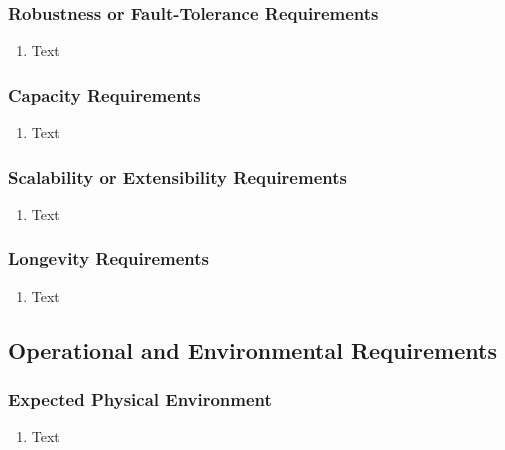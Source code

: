 \documentclass [11pt]{article}
\begin{document}
\subsubsection{Robustness or Fault-Tolerance Requirements }
	\begin{enumerate}[label=\textbf{(\roman*)}]
		\item Text
	\end{enumerate}

\subsubsection{Capacity Requirements }
	\begin{enumerate}[label=\textbf{(\roman*)}]
		\item Text
	\end{enumerate}

\subsubsection{Scalability or Extensibility Requirements }
	\begin{enumerate}[label=\textbf{(\roman*)}]
		\item Text
	\end{enumerate}

\subsubsection{Longevity Requirements }
	\begin{enumerate}[label=\textbf{(\roman*)}]
		\item Text
	\end{enumerate}

\subsection{Operational and Environmental Requirements}

\subsubsection{Expected Physical Environment }
	\begin{enumerate}[label=\textbf{(\roman*)}]
		\item Text
	\end{enumerate}
\end{document}
